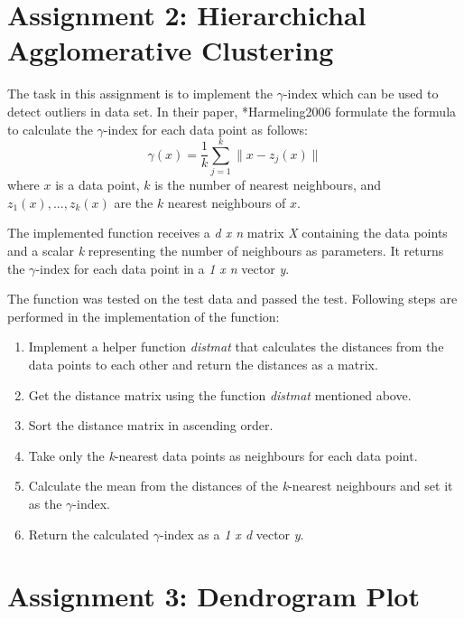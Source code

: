 \section{Assignment 2: Hierarchichal Agglomerative Clustering}
\label{sec:assignment2}

The task in this assignment is to implement the $\gamma$-index which can be used to detect outliers in data set. In their paper, \citeasnoun**{Harmeling2006} formulate the formula to calculate the $\gamma$-index for each data point as follows:
\begin{equation}
	\gamma(x)=\frac{1}{k} \sum_{j=1}^{k} \| x-z_j(x) \|
\end{equation}
where $x$ is a data point, $k$ is the number of nearest neighbours, and $z_1(x),...,z_k(x)$ are the $k$ nearest neighbours of $x$.

The implemented function receives a \textit{d x n} matrix \textit{X} containing the data points and a scalar \textit{k} representing the number of neighbours as parameters. It returns the $\gamma$-index for each data point in a \textit{1 x n} vector \textit{y}.

The function was tested on the test data and passed the test. Following steps are performed in the implementation of the function:
\begin{enumerate}
	\item Implement a helper function \textit{distmat} that calculates the distances from the data points to each other and return the distances as a matrix.
	\item Get the distance matrix using the function \textit{distmat} mentioned above.
	\item Sort the distance matrix in ascending order.
	\item Take only the \textit{k}-nearest data points as neighbours for each data point.
	\item Calculate the mean from the distances of the \textit{k}-nearest neighbours and set it as the $\gamma$-index.
	\item Return the calculated $\gamma$-index as a \textit{1 x d} vector \textit{y}.
	
\end{enumerate}


\section{Assignment 3: Dendrogram Plot}
\label{sec:assignment3}

